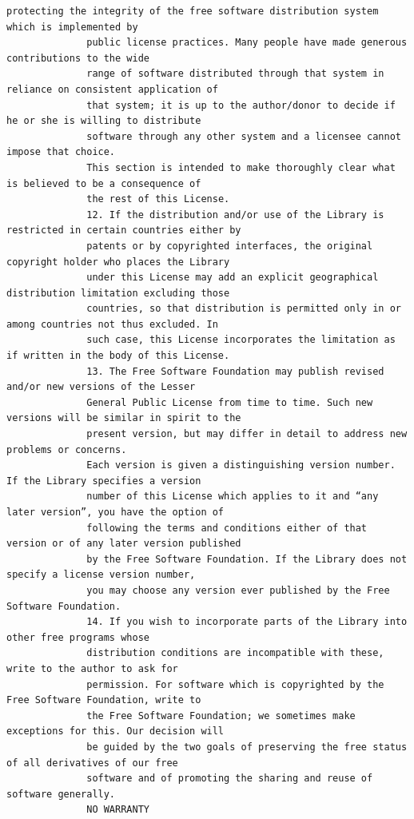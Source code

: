 \begin{lstlisting}[basicstyle=\ttfamily\scriptsize,breaklines=true]
              protecting the integrity of the free software distribution system which is implemented by
              public license practices. Many people have made generous contributions to the wide
              range of software distributed through that system in reliance on consistent application of
              that system; it is up to the author/donor to decide if he or she is willing to distribute
              software through any other system and a licensee cannot impose that choice.
              This section is intended to make thoroughly clear what is believed to be a consequence of
              the rest of this License.
              12. If the distribution and/or use of the Library is restricted in certain countries either by
              patents or by copyrighted interfaces, the original copyright holder who places the Library
              under this License may add an explicit geographical distribution limitation excluding those
              countries, so that distribution is permitted only in or among countries not thus excluded. In
              such case, this License incorporates the limitation as if written in the body of this License.
              13. The Free Software Foundation may publish revised and/or new versions of the Lesser
              General Public License from time to time. Such new versions will be similar in spirit to the
              present version, but may differ in detail to address new problems or concerns.
              Each version is given a distinguishing version number. If the Library specifies a version
              number of this License which applies to it and “any later version”, you have the option of
              following the terms and conditions either of that version or of any later version published
              by the Free Software Foundation. If the Library does not specify a license version number,
              you may choose any version ever published by the Free Software Foundation.
              14. If you wish to incorporate parts of the Library into other free programs whose
              distribution conditions are incompatible with these, write to the author to ask for
              permission. For software which is copyrighted by the Free Software Foundation, write to
              the Free Software Foundation; we sometimes make exceptions for this. Our decision will
              be guided by the two goals of preserving the free status of all derivatives of our free
              software and of promoting the sharing and reuse of software generally.
              NO WARRANTY

\end{lstlisting}
